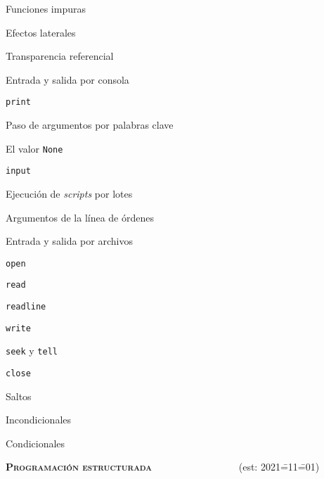 \begin{longenum}
\begin{longenum}
\begin{longenum}
            \item Funciones impuras
            \item Efectos laterales
            \item Transparencia referencial
            \item Entrada y salida por consola
            \begin{longenum}
                \item \texttt{print}
                \begin{longenum}
                    \item Paso de argumentos por palabras clave
                    \item El valor \texttt{None}
                \end{longenum}
                \item \texttt{input}
            \end{longenum}
            \item Ejecución de \textit{scripts} por lotes
            \begin{longenum}
                \item Argumentos de la línea de órdenes
            \end{longenum}
            \item Entrada y salida por archivos
            \begin{longenum}
                \item \texttt{open}
                \item \texttt{read}
                \item \texttt{readline}
                \item \texttt{write}
                \item \texttt{seek} y \texttt{tell}
                \item \texttt{close}
            \end{longenum}
        \end{longenum}
        \item Saltos
        \begin{longenum}
            \item Incondicionales
            \item Condicionales
        \end{longenum}
    \end{longenum}
    \item \textbf{\textsc{Programación estructurada}} \ \ \ \ \ \ \ \ \ \ \ \ \ \ \ \ \ (est: 2021\==11\==01)

\end{longenum}
